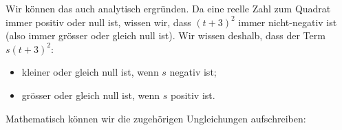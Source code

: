 \documentclass[12pt]{article}
\begin{document}
Wir können das auch analytisch ergründen. Da eine reelle Zahl zum Quadrat immer positiv oder null ist, wissen wir, dass $(t+3)^2$ immer nicht-negativ ist (also immer grösser oder gleich null ist). Wir wissen deshalb, dass der Term $s(t+3)^2$:
\begin{itemize}
\item kleiner oder gleich null ist, wenn $s$ negativ ist;
\item grösser oder gleich null ist, wenn $s$ positiv ist.
\end{itemize}
Mathematisch können wir die zugehörigen Ungleichungen aufschreiben:\\
\begin{center}
\hfill
\vrule
\hfill
\end{center}
\end{document}
